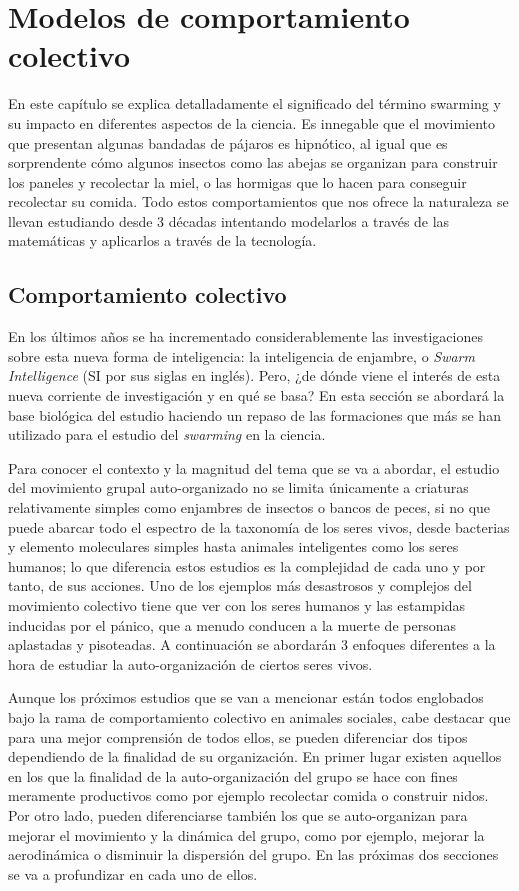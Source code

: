 \chapter{Modelos de comportamiento colectivo} \label{cap2}

En este capítulo se explica detalladamente el significado del término swarming y su impacto en diferentes aspectos de la ciencia. Es innegable que el movimiento que presentan algunas bandadas de pájaros es hipnótico, al igual que es sorprendente cómo algunos insectos como las abejas se organizan para construir los paneles y recolectar la miel, o las hormigas que lo hacen para conseguir recolectar su comida. Todo estos comportamientos que nos ofrece la naturaleza se llevan estudiando desde 3 décadas intentando modelarlos a través de las matemáticas y aplicarlos a través de la tecnología.

\section{Comportamiento colectivo} \label{s2_1}
En los últimos años se ha incrementado considerablemente las investigaciones sobre esta nueva forma de inteligencia: la inteligencia de enjambre, o \textit{Swarm Intelligence} (SI por sus siglas en inglés). Pero, ¿de dónde viene el interés de esta nueva corriente de investigación y en qué se basa? En esta sección se abordará la base biológica del estudio haciendo un repaso de las formaciones que más se han utilizado para el estudio del \textit{swarming} en la ciencia.

Para conocer el contexto y la magnitud del tema que se va a abordar, el estudio del movimiento grupal auto-organizado no se limita únicamente a criaturas relativamente simples como enjambres de insectos o bancos de peces, si no que puede abarcar todo el espectro de la taxonomía de los seres vivos, desde bacterias y elemento moleculares simples \cite{nicolis1977selfOrg} hasta animales inteligentes como los seres humanos; lo que diferencia estos estudios es la complejidad de cada uno y por tanto, de sus acciones. Uno de los ejemplos más desastrosos y complejos del movimiento colectivo tiene que ver con los seres humanos y las estampidas inducidas por el pánico, que a menudo conducen a la muerte de personas aplastadas y pisoteadas. A continuación se abordarán 3 enfoques diferentes a la hora de estudiar la auto-organización de ciertos seres vivos.

Aunque los próximos estudios que se van a mencionar están todos englobados bajo la rama de comportamiento colectivo en animales sociales, cabe destacar que para una mejor comprensión de todos ellos, se pueden diferenciar dos tipos dependiendo de la finalidad de su organización. En primer lugar existen aquellos en los que la finalidad de la auto-organización del grupo se hace con fines meramente productivos como por ejemplo recolectar comida o construir nidos. Por otro lado, pueden diferenciarse también los que se auto-organizan para mejorar el movimiento y la dinámica del grupo, como por ejemplo, mejorar la aerodinámica o disminuir la dispersión del grupo. En las próximas dos secciones se va a profundizar en cada uno de ellos.

